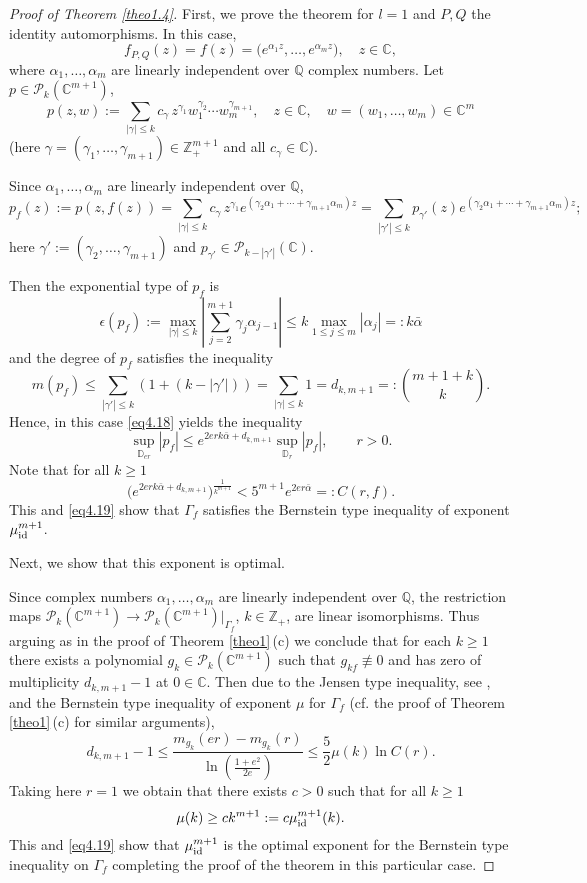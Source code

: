 \documentclass[11pt, oneside]{amsart}
\begin{document}
\begin{proof}[Proof of Theorem \ref{theo1.4}]
First, we prove the theorem for $l=1$ and $P,Q$ the identity automorphisms. In this case, 
\[
f_{P,Q}(z)=f(z)=\bigl(e^{\alpha_1 z},\dots, e^{\alpha_m z}\bigr),\quad z\in\mathbb C,
\]
where $\alpha_1,\dots, \alpha_m$ are linearly independent over $\mathbb Q$ complex numbers.
Let $p\in\mathcal P_k(\mathbb C^{m+1})$,
\[
p(z,w):=\sum_{ |\gamma|\le k}c_\gamma\, z^{\gamma_1} w_1^{\gamma_2}\cdots w_m^{\gamma_{m+1}},\quad z\in\mathbb C,\quad w=(w_1,\dots, w_m)\in\mathbb C^m
\]
(here $\gamma=(\gamma_1,\dots,\gamma_{m+1})\in\mathbb Z_+^{m+1}$ and all $c_\gamma\in\mathbb C$).

Since $\alpha_1,\dots ,\alpha_m$ are linearly independent over $\mathbb Q$,
\[
p_f(z):=p(z, f(z))=\sum_{ |\gamma|\le k}c_\gamma\, z^{\gamma_1}e^{(\gamma_2 \alpha_1+\cdots +\gamma_{m+1} \alpha_m) z}=\sum_{|\gamma'|\le k} p_{\gamma'}(z) e^{(\gamma_2 \alpha_1+\cdots +\gamma_{m+1} \alpha_m) z};
\]
here $\gamma':=(\gamma_2,\dots,\gamma_{m+1})$ and
$p_{\gamma'}\in\mathcal P_{k-|\gamma'|}(\mathbb C)$. 

Then the exponential type of $p_f$ is
\[
\epsilon(p_f):=\max_{|\gamma|\le k} \left|\sum_{j=2}^{m+1} \gamma_j \alpha_{j-1}\right|\le k\max_{1\le j\le m}|\alpha_j|=:k \bar \alpha
\]
and the degree  of $p_f$ satisfies the inequality
\[
m(p_f)\le \sum_{|\gamma'|\le k}(1+(k-|\gamma'|))= \sum_{|\gamma|\le k} 1=d_{k,m+1}=:\binom{m+1+k}{k}.
\]
Hence, in this case \eqref{eq4.18} yields the inequality
\begin{equation}\label{eq4.19}
\sup_{\mathbb D_{er}}|p_f|\le e^{2er k\bar \alpha+d_{k,m+1}}\sup_{\mathbb D_{r}}|p_f|,\qquad r>0.
\end{equation}
Note that for all $k\ge 1$
\[
\bigl(e^{2er k\bar \alpha+d_{k,m+1}}\bigr)^{\frac{1}{k^{m+1}}}< 5^{m+1} e^{2er \bar\alpha}=:C(r,f).
\]
This and \eqref{eq4.19} show that $\Gamma_f$ satisfies the Bernstein type inequality of exponent $\mu_{{\rm id}}^{m+1}$. 

Next, we show that this exponent is optimal.

Since complex numbers $\alpha_1,\dots,\alpha_m$ are linearly independent over $\mathbb Q$, the restriction maps $\mathcal P_k(\mathbb C^{m+1})\rightarrow \mathcal P_k(\mathbb C^{m+1})|_{\Gamma_f}$, $k\in\mathbb Z_+$, are linear isomorphisms. Thus 
arguing as in the proof of Theorem \ref{theo1}\,(c) we conclude that for each $k\ge 1$ there exists a polynomial $g_k\in\mathcal P_k(\mathbb C^{m+1})$ such that  $g_{kf}\not\equiv 0$ and has zero of multiplicity $d_{k,m+1}-1$ at $0\in\mathbb C$.
Then due to the Jensen type inequality, see \cite[Lm.\,1]{VP}, and the Bernstein type inequality of exponent $\mu$ for $\Gamma_f$ (cf. the proof of Theorem \ref{theo1}\,(c) for similar arguments),
\[
d_{k,m+1}-1\le  \frac{m_{g_k}(er)-m_{g_k}(r)}{\ln\left(\frac{1+e^2}{2e}\right)}\le  \frac 52 \mu(k)\ln C(r).
\]
Taking here $r=1$ we obtain that there exists $c>0$ such that for all $k\ge 1$
\[
\mu(k)\ge c k^{m+1}:=c\mu_{{\rm id}}^{m+1}(k).
\]
This and \eqref{eq4.19} show that $\mu_{{\rm id}}^{m+1}$ is the optimal exponent for the Bernstein type inequality on $\Gamma_f$ completing the proof of the theorem in this particular case.\smallskip


\end{proof}
\end{document}
